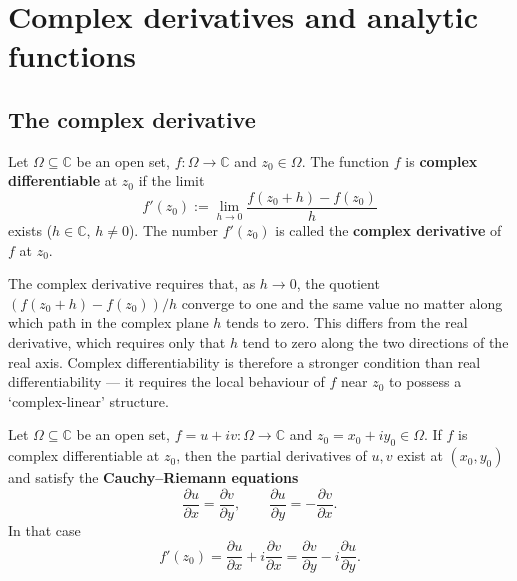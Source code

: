 \section{Complex derivatives and analytic functions}

\subsection{The complex derivative}

\begin{definition}\label{def:ca_complex_derivative}
Let $\Omega \subseteq \mathbb{C}$ be an open set, $f: \Omega \to \mathbb{C}$ and $z_0 \in \Omega$. The function $f$ is \textbf{complex differentiable} at $z_0$ if the limit
\[
f'(z_0) := \lim_{h \to 0} \frac{f(z_0 + h) - f(z_0)}{h}
\]
exists ($h \in \mathbb{C}$, $h \neq 0$). The number $f'(z_0)$ is called the \textbf{complex derivative} of $f$ at $z_0$.
\end{definition}

\begin{remark}\label{rem:ca_derivative_difference}
The complex derivative requires that, as $h \to 0$, the quotient $(f(z_0 + h) - f(z_0))/h$ converge to one and the same value no matter along which path in the complex plane $h$ tends to zero. This differs from the real derivative, which requires only that $h$ tend to zero along the two directions of the real axis. Complex differentiability is therefore a stronger condition than real differentiability --- it requires the local behaviour of $f$ near $z_0$ to possess a `complex-linear' structure.
\end{remark}

\begin{theorem}\label{thm:ca_cauchy_riemann}
Let $\Omega \subseteq \mathbb{C}$ be an open set, $f = u + iv: \Omega \to \mathbb{C}$ and $z_0 = x_0 + iy_0 \in \Omega$. If $f$ is complex differentiable at $z_0$, then the partial derivatives of $u, v$ exist at $(x_0, y_0)$ and satisfy the \textbf{Cauchy--Riemann equations}
\[
\frac{\partial u}{\partial x} = \frac{\partial v}{\partial y}, \qquad \frac{\partial u}{\partial y} = -\frac{\partial v}{\partial x}.
\]
In that case
\[
f'(z_0) = \frac{\partial u}{\partial x} + i \frac{\partial v}{\partial x} = \frac{\partial v}{\partial y} - i \frac{\partial u}{\partial y}.
\]
\end{theorem}

